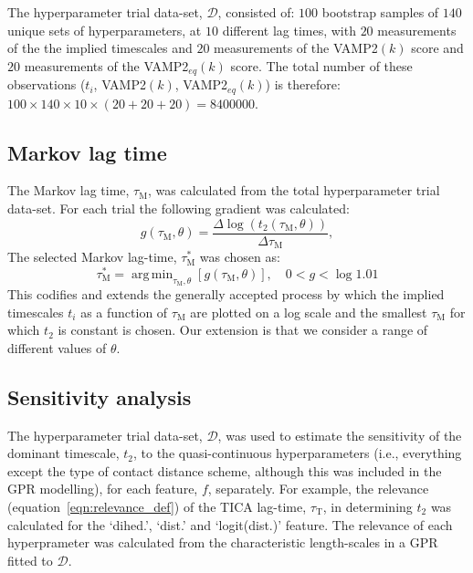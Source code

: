 \documentclass[journal=jacsat,manuscript=article]{achemso}
\DeclareMathOperator*{\argmin}{arg\,min}
\begin{document}
The hyperparameter trial data-set, $\mathcal{D}$, consisted of: $100$ bootstrap samples of $140$  unique sets of hyperparameters, at $10$ different lag times, with  $20$ measurements of the the implied timescales and $20$ measurements of the VAMP2$(k)$ score and $20$ measurements of the VAMP2$_{eq}(k)$ score. The total number of these observations ($t_i$, VAMP2$(k)$, VAMP2$_{eq}(k)$) is therefore: $100 \times 140 \times 10 \times (20 + 20 + 20) = \num{8400000}$. 

\subsection{Markov lag time}
The Markov lag time, $\tau_{\mathrm{M}}$, was calculated from the total hyperparameter trial data-set. For each trial the following gradient was calculated:
\begin{equation}
    g(\tau_{\mathrm{M}}, \theta) = \frac{\Delta \log{\left(t_{2}(\tau_{\mathrm{M}}, \theta)\right)}}{\Delta \tau_{\mathrm{M}}}, 
\end{equation}\label{eqn:choose_lag_1}
The selected Markov lag-time, $\tau^{*}_{\mathrm{M}}$ was chosen as:
\begin{equation}
    \tau^{*}_{\mathrm{M}}  = \argmin_{\tau_{\mathrm{M}}, \theta}\left[g(\tau_{\mathrm{M}}, \theta)\right], \quad 0 < g < \log{1.01}
\end{equation}\label{eqn:choose_lag_2}
This codifies and extends the generally accepted process by which the implied timescales $t_{i}$ as a function of $\tau_{\mathrm{M}}$ are plotted on a log scale and the smallest $\tau_{\mathrm{M}}$ for which $t_{2}$ is constant is chosen. Our extension is that we consider a range of different values of $\theta$. 

\subsection{Sensitivity analysis}

The hyperparameter trial data-set, $\mathcal{D}$, was used to estimate the sensitivity of the dominant timescale, $t_2$, to the quasi-continuous hyperparameters (i.e., everything except the type of contact distance scheme, although this was included in the GPR modelling), for each feature, $f$, separately. For example, the relevance (equation~\ref{eqn:relevance_def}) of the TICA lag-time, $\tau_{\mathrm{T}}$, in determining $t_2$ was calculated for the `dihed.', `dist.' and `logit(dist.)' feature.  The relevance of each hyperprameter was calculated from the characteristic length-scales in a GPR fitted to $\mathcal{D}$.  
\end{document}
